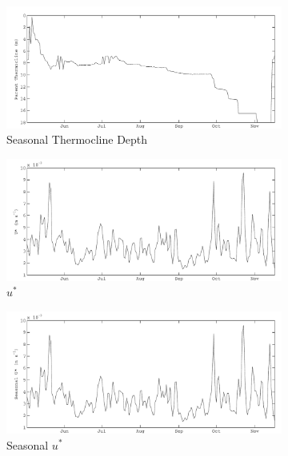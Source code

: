 \begin{figure}
    \begin{subfigure}{\lafigsize}
      \caption{\label{fig:la:out:SthermD}Seasonal Thermocline Depth}
      \includegraphics[width=\linewidth]{figures/Sparkling_SthermD.pdf}
    \end{subfigure}
    \begin{subfigure}{\lafigsize}
      \caption{\label{fig:la:out:uSt}$u^{*}$}
      \includegraphics[width=\linewidth]{figures/Sparkling_uSt.pdf}
    \end{subfigure}
    \begin{subfigure}{\lafigsize}
      \caption{\label{fig:la:out:SuSt}Seasonal $u^{*}$}
      \includegraphics[width=\linewidth]{figures/Sparkling_SuSt.pdf}
    \end{subfigure}
    \begin{subfigure}{\lafigsize}

\end{subfigure}
\end{figure}

